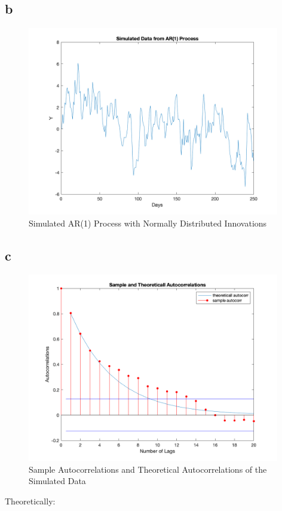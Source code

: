 \documentclass{report}
\begin{document}
\subsection*{b}

\begin{figure}[H]
	\centering
	\includegraphics[width = 11cm]{3b}
	\caption{Simulated AR(1) Process with Normally Distributed Innovations} 
\end{figure}

\subsection*{c}

\begin{figure}[H]
	\centering
	\includegraphics[width = 11cm]{3c}
	\caption{Sample Autocorrelations and Theoretical Autocorrelations of the Simulated Data} 
\end{figure}


Theoretically:
\end{document}
